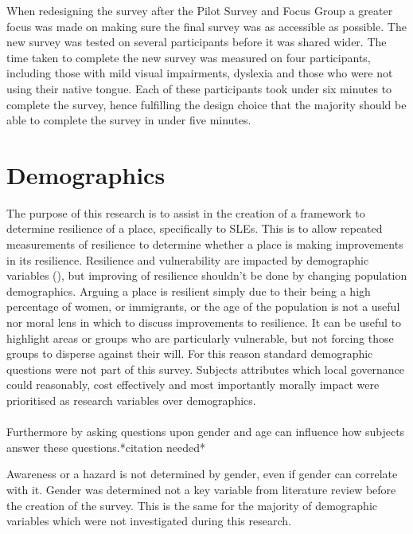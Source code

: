 When redesigning the survey after the Pilot Survey and Focus Group a greater focus was made on making sure the final survey was as accessible as possible. The new survey was tested on several participants before it was shared wider. The time taken to complete the new survey was measured on four participants, including those with mild visual impairments, dyslexia and those who were not using their native tongue. Each of these participants took under six minutes to complete the survey, hence fulfilling the design choice that the majority should be able to complete the survey in under five minutes. 
\paragraph{}



\section{Demographics}
The purpose of this research is to assist in the creation of a framework to determine resilience of a place, specifically to SLEs. This is to allow repeated measurements of resilience to determine whether a place is making improvements in its resilience. Resilience and vulnerability are impacted by demographic variables (\cite{rod_integrated_2012}), but improving of resilience shouldn't be done by changing population demographics. Arguing a place is resilient simply due to their being a high percentage of women, or immigrants, or the age of the population is not a useful nor moral lens in which to discuss improvements to resilience. It can be useful to highlight areas or groups who are particularly vulnerable, but not forcing those groups to disperse against their will. For this reason standard demographic questions were not part of this survey. Subjects attributes which local governance could reasonably, cost effectively and most importantly morally impact were prioritised as research variables over demographics. 
\paragraph{}
Furthermore by asking questions upon gender and age can influence how subjects answer these questions.*citation needed*

Awareness or a hazard is not determined by gender, even if gender can correlate with it.  Gender was determined not a key variable from literature review before the creation of the survey. This is the same for the majority of demographic variables which were not investigated during this research.
